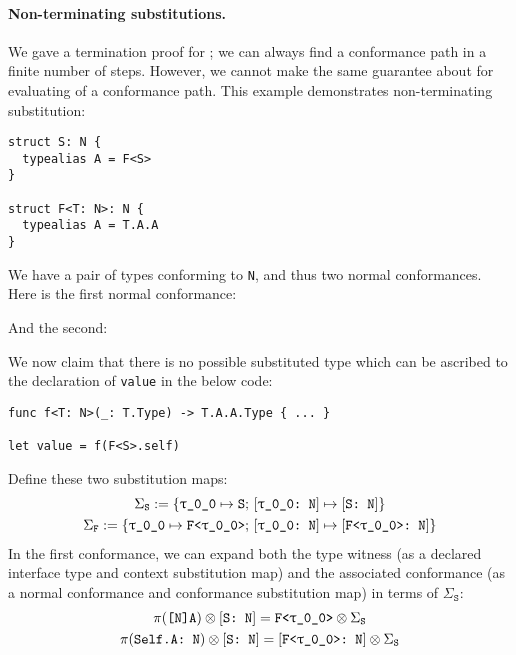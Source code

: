 \documentclass[../generics]{subfiles}
\begin{document}
\paragraph{Non-terminating substitutions.}
We gave a termination proof for ; we can always find a conformance path in a finite number of steps. However, we cannot make the same guarantee about  for evaluating of a conformance path.  This example demonstrates non-terminating substitution:
\begin{Verbatim}
struct S: N {
  typealias A = F<S>
}

struct F<T: N>: N {
  typealias A = T.A.A
}
\end{Verbatim}
We have a pair of types conforming to \texttt{N}, and thus two normal conformances. Here is the first normal conformance:
\begin{center}
\end{center}
And the second:
\begin{center}
\end{center}
We now claim that there is no possible substituted type which can be ascribed to the declaration of \texttt{value} in the below code:
\begin{Verbatim}
func f<T: N>(_: T.Type) -> T.A.A.Type { ... }

let value = f(F<S>.self)
\end{Verbatim}
Define these two substitution maps:
\begin{gather*} \Sigma_\texttt{S}:=\SubstMapC{\SubstType{\rT}{S}}{\SubstConf{\rT}{S}{N}}\\
\Sigma_\texttt{F} := \SubstMapC{\SubstType{\rT}{F<\rT>}}{\SubstConf{\rT}{F<\rT>}{N}}
\end{gather*}
In the first conformance, we can expand both the type witness (as a declared interface type and context substitution map) and the associated conformance (as a normal conformance and conformance substitution map) in terms of $\Sigma_\texttt{S}$:
\begin{gather*}
\AssocType{[N]A} \otimes \ConfReq{S}{N} = \texttt{F<\rT>}\otimes \Sigma_\texttt{S}\\
\SelfAToN \otimes \ConfReq{S}{N} = \ConfReq{F<\rT>}{N}\otimes \Sigma_\texttt{S}
\end{gather*}
\end{document}
